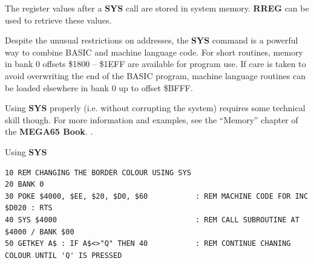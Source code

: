 \begin{description}[leftmargin=2cm,style=nextline]
\item [Remarks:]  The register values after a {\bf SYS} call are stored in system memory. {\bf RREG} can be used to retrieve these values.

                  Despite the unusual restrictions on addresses, the {\bf SYS} command is a powerful way to combine BASIC and machine language code. For short routines, memory in bank 0 offsets \$1800 -- \$1EFF are available for program use. If care is taken to avoid overwriting the end of the BASIC program, machine language routines can be loaded elsewhere in bank 0 up to offset \$BFFF.

                  Using {\bf SYS} properly (i.e. without corrupting the system) requires some technical skill though. For more information and examples, see \ifdefined\printmanual
                     the ``Memory'' chapter of the {\bf MEGA65 Book}.
                  \else
                     .
                  \fi

\item [Example:]  Using {\bf SYS}

\begin{tcolorbox}[colback=black,coltext=white]
\verbatimfont{\codefont}
\begin{verbatim}
10 REM CHANGING THE BORDER COLOUR USING SYS
20 BANK 0
30 POKE $4000, $EE, $20, $D0, $60           : REM MACHINE CODE FOR INC $D020 : RTS
40 SYS $4000                                : REM CALL SUBROUTINE AT $4000 / BANK $00
50 GETKEY A$ : IF A$<>"Q" THEN 40           : REM CONTINUE CHANING COLOUR UNTIL 'Q' IS PRESSED
\end{verbatim}
\end{tcolorbox}
\end{description}


\newpage
